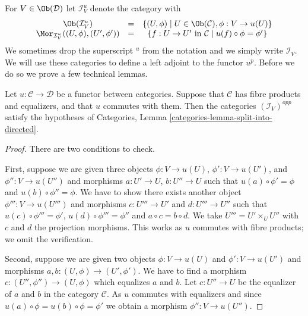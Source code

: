 \medskip\noindent
For $V \in \Ob(\mathcal{D})$ let $\mathcal{I}^u_V$
denote the category with
\begin{equation}
\label{equation-colim-category}
\begin{matrix}
\Ob(\mathcal{I}^u_V)
&
=
&
\{
(U, \phi)
\mid
U \in \Ob(\mathcal{C}),
\phi : V \to u(U)
\}
\\
\Mor_{\mathcal{I}^u_V}((U, \phi), (U', \phi'))
&
=
&
\{
f : U \to U' \text{ in }\mathcal{C}
\mid
u(f) \circ \phi = \phi'
\}
\end{matrix}
\end{equation}
We sometimes drop the superscript ${}^u$ from the notation and we simply write
$\mathcal{I}_V$.
We will use these categories to define a left adjoint to the functor $u^p$.
Before we do so we prove a few technical lemmas.

\begin{lemma}
\label{lemma-almost-directed}
Let $u : \mathcal{C} \to \mathcal{D}$ be a functor between categories.
Suppose that $\mathcal{C}$ has fibre products and equalizers, and that
$u$ commutes with them. Then the categories $(\mathcal{I}_V)^{opp}$
satisfy the hypotheses of
Categories, Lemma \ref{categories-lemma-split-into-directed}.
\end{lemma}

\begin{proof}
There are two conditions to check.

\medskip\noindent
First, suppose we are given three objects
$\phi : V \to u(U)$, $\phi' : V \to u(U')$, and $\phi'' : V \to u(U'')$
and morphisms $a : U' \to U$, $b : U'' \to U$ such that
$u(a) \circ \phi' = \phi$ and $u(b) \circ \phi'' = \phi$.
We have to show there exists another object $\phi''' : V \to u(U''')$
and morphisms $c : U''' \to U'$ and $d : U''' \to U''$ such that
$u(c) \circ \phi''' = \phi'$, $u(d) \circ \phi''' = \phi''$ and
$a \circ c = b \circ d$. We take $U''' = U' \times_U U''$
with $c$ and $d$ the projection morphisms. This works as $u$ commutes
with fibre products; we omit the verification.

\medskip\noindent
Second, suppose we are given two objects
$\phi : V \to u(U)$ and $\phi' : V \to u(U')$
and morphisms $a, b : (U, \phi) \to (U', \phi')$.
We have to find a morphism $c : (U'', \phi'') \to (U, \phi)$
which equalizes $a$ and $b$. Let $c : U'' \to U$ be the equalizer of
$a$ and $b$ in the category $\mathcal{C}$. As $u$ commutes
with equalizers and since $u(a) \circ \phi = u(b) \circ \phi = \phi'$
we obtain a morphism $\phi'' : V \to u(U'')$.
\end{proof}

